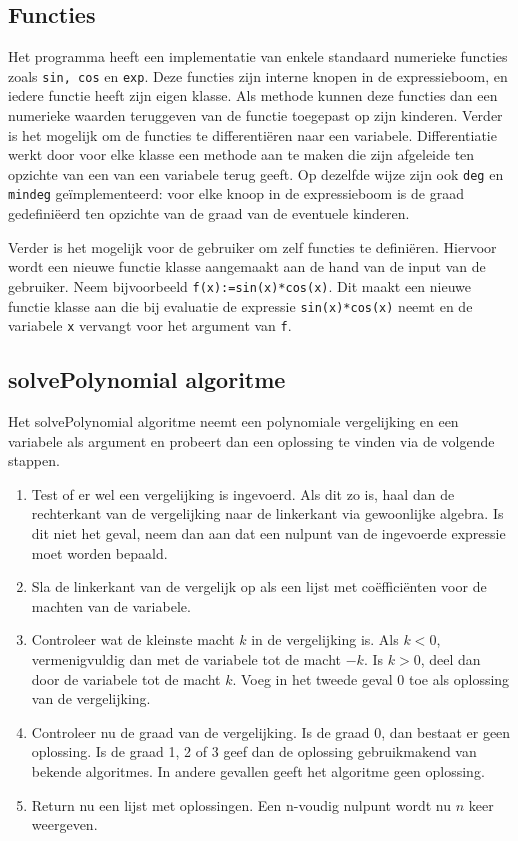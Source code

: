 \documentclass[a4paper]{article}
\newcommand{\ttt}[1]{\texttt{#1}}
\begin{document}
\subsection{Functies}
Het programma heeft een implementatie van enkele standaard numerieke functies zoals \ttt{sin, cos} en \ttt{exp}. Deze functies zijn interne knopen in de expressieboom, en iedere functie heeft zijn eigen klasse. Als methode kunnen deze functies dan een numerieke waarden teruggeven van de functie toegepast op zijn kinderen. Verder is het mogelijk om de functies te differenti\"eren naar een variabele. Differentiatie werkt door voor elke klasse een methode aan te maken die zijn afgeleide ten opzichte van een van een variabele terug geeft. Op dezelfde wijze zijn ook \ttt{deg} en \ttt{mindeg} ge\"implementeerd: voor elke knoop in de expressieboom is de graad gedefini\"eerd ten opzichte van de graad van de eventuele kinderen. 

 Verder is het mogelijk voor de gebruiker om zelf functies te defini\"eren. Hiervoor wordt een nieuwe functie klasse aangemaakt aan de hand van de input van de gebruiker. Neem bijvoorbeeld \ttt{f(x):=sin(x)*cos(x)}. Dit maakt een nieuwe functie klasse aan die bij evaluatie de expressie \ttt{sin(x)*cos(x)} neemt en de variabele \ttt{x} vervangt voor het argument van \ttt{f}. 


\subsection{solvePolynomial algoritme}
Het solvePolynomial algoritme neemt een polynomiale vergelijking en een variabele als argument en probeert dan een oplossing te vinden via de volgende stappen.
\begin{enumerate}
\item Test of er wel een vergelijking is ingevoerd. Als dit zo is, haal dan de rechterkant van de vergelijking naar de linkerkant via gewoonlijke algebra. Is dit niet het geval, neem dan aan dat een nulpunt van de ingevoerde expressie moet worden bepaald.
\item Sla de linkerkant van de vergelijk op als een lijst met co\"effici\"enten voor de machten van de variabele. 
\item Controleer wat de kleinste macht $k$ in de vergelijking is. Als $k<0$, vermenigvuldig dan met de variabele tot de macht $-k$. Is $k>0$, deel dan door de variabele tot de macht $k$. Voeg in het tweede geval 0 toe als oplossing van de vergelijking.
\item Controleer nu de graad van de vergelijking. Is de graad 0, dan bestaat er geen oplossing. Is de graad 1, 2 of 3 geef dan de oplossing gebruikmakend van bekende algoritmes. In andere gevallen geeft het algoritme geen oplossing.
\item Return nu een lijst met oplossingen. Een n-voudig nulpunt wordt nu $n$ keer weergeven.
\end{enumerate}
\end{document}
